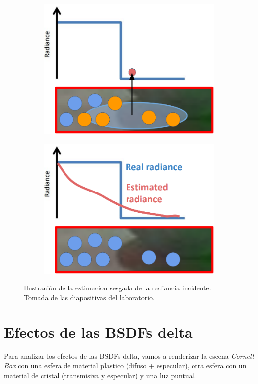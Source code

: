 \documentclass{article}
\begin{document}
\begin{figure}
\begin{subfigure}[h]{0.4\linewidth}
\includegraphics[width=\linewidth]{imgs/rad1.png}
\end{subfigure}
\hfill
\begin{subfigure}[h]{0.4\linewidth}
\includegraphics[width=\linewidth]{imgs/rad2.png}
\end{subfigure}
\caption{Ilustración de la estimacion sesgada de la radiancia incidente. Tomada de las diapositivas del laboratorio.}
\end{figure}

\section{Efectos de las BSDFs delta}
Para analizar los efectos de las BSDFs delta, vamos a renderizar la escena
\textit{Cornell Box} con una esfera de material plastico (difuso + especular),
otra esfera con un material de cristal (transmisiva y especular) y una luz
puntual.
\end{document}
